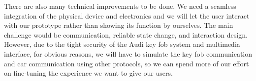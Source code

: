 \noindent There are also many technical improvements to be done. We need a seamless integration of the physical device and electronics and we will let the user interact with our prototype rather than showing its function by ourselves. The main challenge would be communication, reliable state change, and interaction design. However, due to the tight security of the Audi key fob system and multimedia interface, for obvious reasons, we will have to simulate the key fob communication and car communication using other protocols, so we can spend more of our effort on fine-tuning the experience we want to give our users.